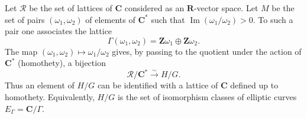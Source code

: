 Let $\mathcal{R}$ be the set of lattices of $\mathbf{C}$ considered as an $\mathbf{R}$-vector space. Let $M$ be the set of pairs $(\omega_1, \omega_2)$ of elements of $\mathbf{C}^*$ such that $\operatorname{Im}(\omega_1/\omega_2) > 0$. To such a pair one associates the lattice
$$\Gamma(\omega_1, \omega_2) = \mathbf{Z}\omega_1 \oplus \mathbf{Z}\omega_2.$$
The map $(\omega_1, \omega_2) \mapsto \omega_1/\omega_2$ gives, by passing to the quotient under the action of $\mathbf{C}^*$ (homothety), a bijection
$$\mathcal{R}/\mathbf{C}^* \xrightarrow{\sim} H/G.$$
Thus an element of $H/G$ can be identified with a lattice of $\mathbf{C}$ defined up to homothety. Equivalently, $H/G$ is the set of isomorphism classes of elliptic curves $E_\Gamma = \mathbf{C}/\Gamma$.

